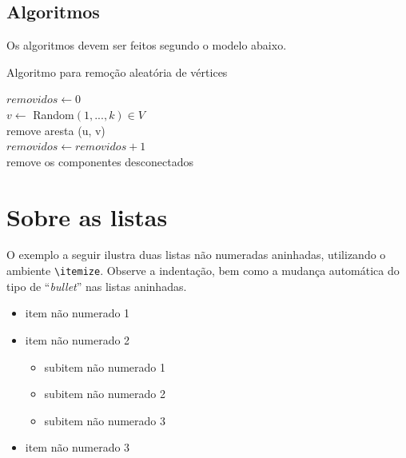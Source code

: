\begin{apendicesenv}
    \section{Algoritmos}\label{sec_algoritmos}

    Os  algoritmos devem ser feitos segundo o modelo abaixo.

    \begin{algorithm}
        \caption{Algoritmo para remoção aleatória de vértices}
        $removidos \leftarrow 0$ \\
         {
            $v \leftarrow$ Random$(1, ..., k) \in V$ \\
             {
                remove aresta (u, v)\\
                $removidos \leftarrow removidos + 1$\\
            }
             {
                remove os componentes desconectados\\
            }
        }
    \end{algorithm}


    \chapter{Sobre as listas}
    \label{chap_sobre_as_listas}

    O exemplo a seguir ilustra duas listas não numeradas aninhadas, utilizando o ambiente \verb|\itemize|.
    Observe a indentação, bem como a mudança automática do tipo de ``\textit{bullet}'' nas listas aninhadas.

    \begin{itemize}
        \item item não numerado 1
        \item item não numerado 2
              \begin{itemize}
                  \item subitem não numerado 1
                  \item subitem não numerado 2
                  \item subitem não numerado 3
              \end{itemize}
        \item item não numerado 3
    \end{itemize}


\end{apendicesenv}
